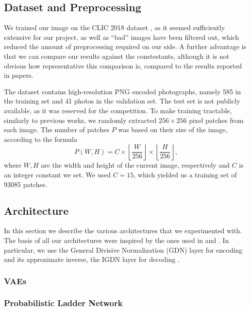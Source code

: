 \documentclass{article}
\begin{document}
\subsection{Dataset and Preprocessing}
\par
We trained our image on the CLIC 2018 dataset \cite{clic2018}, as it seemed
sufficiently extensive for our project, as well as ``bad'' images have been
filtered out, which reduced the amount of preprocessing required on our side.
A further advantage is that we can compare our results against the constestants,
although it is not obvious how representative this comparison is, compared to
the results reported in papers.
\par
The dataset contains high-resolution PNG encoded photographs, namely 585 in the
training set and 41 photos in the validation set. The test set is not
publicly available, as it was reserved for the competition. 
To make training tractable, similarly to previous works, we randomly extracted
$256 \times 256$ pixel patches from each image. The number of patches $P$ was
based on their size of the image, according to the formula
\[
  P(W, H) = C \times \left \lfloor \frac{W}{256} \right \rfloor \times
  \left \lfloor \frac{H}{256} \right \rfloor,
\]
where $W, H$ are the width and height of the current image, respectively and $C$
is an integer constant we set. We used $C = 15$, which yielded us a training set
of 93085 patches.
\subsection{Architecture}
\par
In this section we describe the various architectures that we experimented with.
The basis of all our architectures were inspired by the ones used in
\cite{balle2016end} and \cite{balle2018variational}. In particular, we use the
General Divisive Normalization (GDN) layer for encoding and its approximate
inverse, the IGDN layer for decoding \cite{balle2015density} \cite{balle2016end}.

\subsubsection{VAEs}
\par

\subsubsection{Probabilistic Ladder Network}
\paragraph{}
\end{document}

